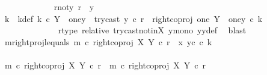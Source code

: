 \begin{isabellebody}
\ \ \ \ \ \ \ \ \ \ \ \isamarkupfalse%
\ r{\isacharunderscore}{\kern0pt}not{\isacharunderscore}{\kern0pt}y{}{\isacharcolon}{\kern0pt}\ {\isachardoublequoteopen}r\ {\isasymnoteq}\ y{}{\isachardoublequoteclose}\isanewline
\ \ \ \ \ \ \ \ \ \ \ \isamarkupfalse%
\ \isamarkupfalse%
\ k\ \ k{\isacharunderscore}{\kern0pt}def{\isacharcolon}{\kern0pt}\ {\isachardoublequoteopen}k\ {\isasymin}\isactrlsub c\ Y\ {\isasymsetminus}\ {\isacharparenleft}{\kern0pt}one{\isacharcomma}{\kern0pt}y{}{\isacharparenright}{\kern0pt}\ {\isasymand}\ try{\isacharunderscore}{\kern0pt}cast\ y{}\ {\isasymcirc}\isactrlsub c\ r\ {\isacharequal}{\kern0pt}\ right{\isacharunderscore}{\kern0pt}coproj\ one\ {\isacharparenleft}{\kern0pt}Y\ {\isasymsetminus}\ {\isacharparenleft}{\kern0pt}one{\isacharcomma}{\kern0pt}y{}{\isacharparenright}{\kern0pt}{\isacharparenright}{\kern0pt}\ {\isasymcirc}\isactrlsub c\ k{\isachardoublequoteclose}\isanewline
\ \ \ \ \ \ \ \ \ \ \ \ \isamarkupfalse%
\ r{\isacharunderscore}{\kern0pt}type\ relative\ try{\isacharunderscore}{\kern0pt}cast{\isacharunderscore}{\kern0pt}not{\isacharunderscore}{\kern0pt}in{\isacharunderscore}{\kern0pt}X\ y{}{\isacharunderscore}{\kern0pt}mono\ y{}y{}{\isacharunderscore}{\kern0pt}def{\isacharparenleft}{\kern0pt}{}{\isacharparenright}{\kern0pt}\ \isamarkupfalse%
\ blast\isanewline
\ \ \ \ \ \ \ \ \ \ \ \isamarkupfalse%
\ m{\isacharunderscore}{\kern0pt}rightproj{\isacharunderscore}{\kern0pt}l{\isacharunderscore}{\kern0pt}equals{\isacharcolon}{\kern0pt}\ {\isachardoublequoteopen}m\ {\isasymcirc}\isactrlsub c\ right{\isacharunderscore}{\kern0pt}coproj\ X\ Y\ {\isasymcirc}\isactrlsub c\ r\ {\isacharequal}{\kern0pt}\ {\isasymlangle}x{}{\isacharcomma}{\kern0pt}\ y{}\isactrlsup c\ {\isasymcirc}\isactrlsub c\ k{\isasymrangle}{\isachardoublequoteclose}\isanewline
\ \ \ \ \ \ \ \ \ \ \ \isanewline
\ \ \ \ \ \ \ \ \ \ \ \isamarkupfalse%
\ {\isacharminus}{\kern0pt}\isanewline
\ \ \ \ \ \ \ \ \ \ \ \ \ \isamarkupfalse%
\ {\isachardoublequoteopen}m\ {\isasymcirc}\isactrlsub c\ right{\isacharunderscore}{\kern0pt}coproj\ X\ Y\ {\isasymcirc}\isactrlsub c\ r\ {\isacharequal}{\kern0pt}\ {\isacharparenleft}{\kern0pt}m\ {\isasymcirc}\isactrlsub c\ right{\isacharunderscore}{\kern0pt}coproj\ X\ Y{\isacharparenright}{\kern0pt}\ {\isasymcirc}\isactrlsub c\ r{\isachardoublequoteclose}\isanewline

\end{isabellebody}
